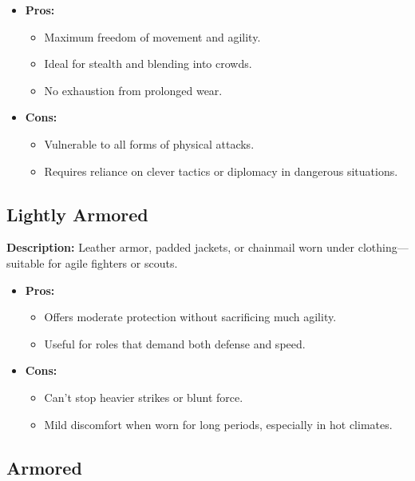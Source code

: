 \documentclass[12pt]{book}
\begin{document}
\begin{itemize}
    \item \textbf{Pros:}
    \begin{itemize}
        \item Maximum freedom of movement and agility.
        \item Ideal for stealth and blending into crowds.
        \item No exhaustion from prolonged wear.
    \end{itemize}
    \item \textbf{Cons:}
    \begin{itemize}
        \item Vulnerable to all forms of physical attacks.
        \item Requires reliance on clever tactics or diplomacy in dangerous situations.
    \end{itemize}
\end{itemize}

\subsection*{Lightly Armored}

\textbf{Description:} Leather armor, padded jackets, or chainmail worn under clothing—suitable for agile fighters or scouts.

\begin{itemize}
    \item \textbf{Pros:}
    \begin{itemize}
        \item Offers moderate protection without sacrificing much agility.
        \item Useful for roles that demand both defense and speed.
    \end{itemize}
    \item \textbf{Cons:}
    \begin{itemize}
        \item Can’t stop heavier strikes or blunt force.
        \item Mild discomfort when worn for long periods, especially in hot climates.
    \end{itemize}
\end{itemize}

\subsection*{Armored}
\end{document}
